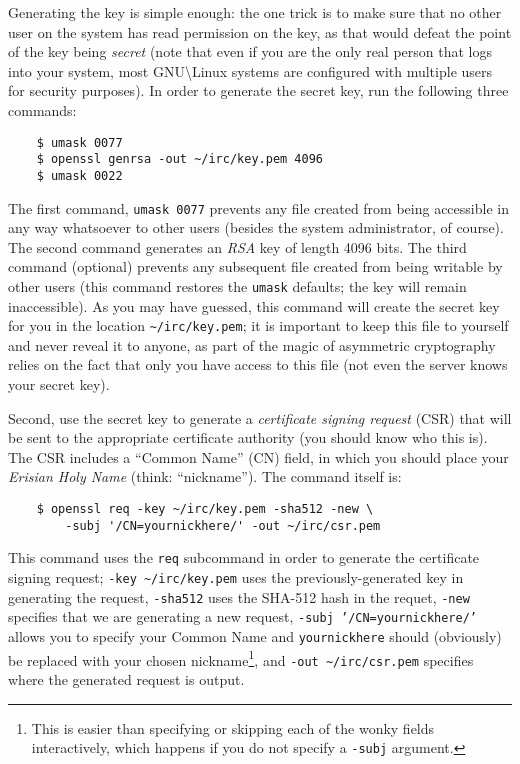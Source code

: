\documentclass{article}
\begin{document}
{Generating the key is simple enough: the one trick is to make sure that no other user on the system has read permission on the key, as that would defeat the point of the key being \textit{secret} (note that even if you are the only real person that logs into your system, most GNU\textbackslash Linux systems are configured with multiple users for security purposes).  In order to generate the secret key, run the following three commands:
\begin{lstlisting}
    $ umask 0077
    $ openssl genrsa -out ~/irc/key.pem 4096
    $ umask 0022
\end{lstlisting}
The first command, \texttt{umask 0077} prevents any file created from being accessible in any way whatsoever to other users (besides the system administrator, of course).  The second command generates an \textit{RSA} key of length 4096 bits.  The third command (optional) prevents any subsequent file created from being writable by other users (this command restores the \texttt{umask} defaults; the key will remain inaccessible).  As you may have guessed, this command will create the secret key for you in the location \texttt{\textasciitilde/irc/key.pem}; it is important to keep this file to yourself and never reveal it to anyone, as part of the magic of asymmetric cryptography relies on the fact that only you have access to this file (not even the server knows your secret key).

Second, use the secret key to generate a \textit{certificate signing request} (CSR) that will be sent to the appropriate certificate authority (you should know who this is).  The CSR includes a ``Common Name'' (CN) field, in which you should place your \textit{Erisian Holy Name} (think: ``nickname'').  The command itself is:
\begin{lstlisting}
    $ openssl req -key ~/irc/key.pem -sha512 -new \
        -subj '/CN=yournickhere/' -out ~/irc/csr.pem
\end{lstlisting}
This command uses the \texttt{req} subcommand in order to generate the certificate signing request; \texttt{-key \textasciitilde/irc/key.pem} uses the previously-generated key in generating the request, \texttt{-sha512} uses the SHA-512 hash in the requet, \texttt{-new} specifies that we are generating a new request, \texttt{-subj '/CN=yournickhere/'} allows you to specify your Common Name and \texttt{yournickhere} should (obviously) be replaced with your chosen nickname\footnote{This is easier than specifying or skipping each of the wonky fields interactively, which happens if you do not specify a \texttt{-subj} argument.}, and \texttt{-out \textasciitilde/irc/csr.pem} specifies where the generated request is output.

}
\end{document}
